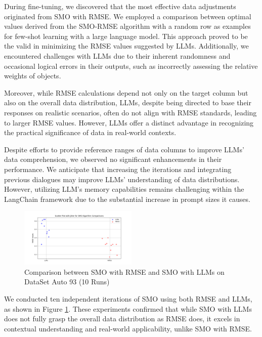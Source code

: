 \documentclass{ieeeaccess}
\begin{document}
    During fine-tuning, we discovered that the most effective data adjustments originated from SMO with RMSE. We employed a comparison between optimal values derived from the SMO-RMSE algorithm with a random row as examples for few-shot learning with a large language model. This approach proved to be the valid in minimizing the RMSE values suggested by LLMs. Additionally, we encountered challenges with LLMs due to their inherent randomness and occasional logical errors in their outputs, such as incorrectly assessing the relative weights of objects.
    
    Moreover, while RMSE calculations depend not only on the target column but also on the overall data distribution, LLMs, despite being directed to base their responses on realistic scenarios, often do not align with RMSE standards, leading to larger RMSE values. However, LLMs offer a distinct advantage in recognizing the practical significance of data in real-world contexts.
    
    Despite efforts to provide reference ranges of data columns to improve LLMs' data comprehension, we observed no significant enhancements in their performance. We anticipate that increasing the iterations and integrating previous dialogues may improve LLMs' understanding of data distributions. However, utilizing LLM's memory capabilities remains challenging within the LangChain framework due to the substantial increase in prompt sizes it causes.
    
    \begin{figure}
    \centering
    \includegraphics[page=1,width=0.5\textwidth]{llms_vs_rmse_10_run.png}
    \caption{Comparison between SMO with RMSE and SMO with LLMs on DataSet Auto 93 (10 Runs) }\label{fig.4}
    \end{figure}
    
    We conducted ten independent iterations of SMO using both RMSE and LLMs, as shown in Figure \ref{fig.4}. These experiments confirmed that while SMO with LLMs does not fully grasp the overall data distribution as RMSE does, it excels in contextual understanding and real-world applicability, unlike SMO with RMSE.
    
\end{document}

